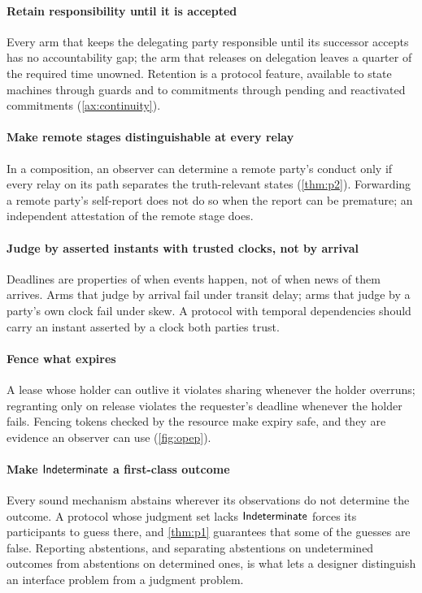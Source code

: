 \paragraph{Retain responsibility until it is accepted} Every arm that keeps the delegating party responsible until its successor accepts has no accountability gap; the arm that releases on delegation leaves a quarter of the required time unowned. Retention is a protocol feature, available to state machines through guards and to commitments through pending and reactivated commitments (\cref{ax:continuity}).

\paragraph{Make remote stages distinguishable at every relay} In a composition, an observer can determine a remote party's conduct only if every relay on its path separates the truth-relevant states (\cref{thm:p2}). Forwarding a remote party's self-report does not do so when the report can be premature; an independent attestation of the remote stage does.

\paragraph{Judge by asserted instants with trusted clocks, not by arrival} Deadlines are properties of when events happen, not of when news of them arrives. Arms that judge by arrival fail under transit delay; arms that judge by a party's own clock fail under skew. A protocol with temporal dependencies should carry an instant asserted by a clock both parties trust.

\paragraph{Fence what expires} A lease whose holder can outlive it violates sharing whenever the holder overruns; regranting only on release violates the requester's deadline whenever the holder fails. Fencing tokens checked by the resource make expiry safe, and they are evidence an observer can use (\cref{fig:opep}).

\paragraph{Make $\mathsf{Indeterminate}$ a first-class outcome} Every sound mechanism abstains wherever its observations do not determine the outcome. A protocol whose judgment set lacks $\mathsf{Indeterminate}$ forces its participants to guess there, and \cref{thm:p1} guarantees that some of the guesses are false. Reporting abstentions, and separating abstentions on undetermined outcomes from abstentions on determined ones, is what lets a designer distinguish an interface problem from a judgment problem.
